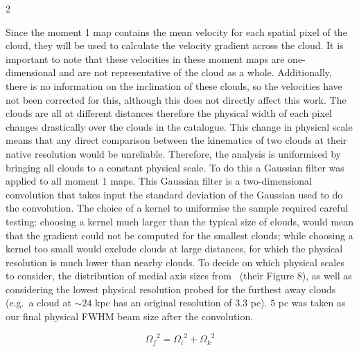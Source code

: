 \documentclass[a4paper,11pt]{article}
\begin{document}
\begin{multicols}{2}
\par\noindent Since the moment 1 map contains the mean velocity for each spatial pixel of the cloud, they will be used to calculate the velocity gradient across the cloud. It is important to note that these velocities in these moment maps are one-dimensional and are not representative of the cloud as a whole. Additionally, there is no information on the inclination of these clouds, so the velocities have not been corrected for this, although this does not directly affect this work. The clouds are all at different distances therefore the physical width of each pixel changes drastically over the clouds in the catalogue. This change in physical scale means that any direct comparison between the kinematics of two clouds at their native resolution would be unreliable. Therefore, the analysis is uniformised by bringing all clouds to a constant physical scale. To do this a Gaussian filter was applied to all moment 1 maps. This Gaussian filter is a two-dimensional convolution that takes input the standard deviation of the Gaussian used to do the convolution. The choice of a kernel to uniformise the sample required careful testing: choosing a kernel much larger than the typical size of clouds, would mean that the gradient could not be computed for the smallest clouds; while choosing a kernel too small would exclude clouds at large distances, for which the physical resolution is much lower than nearby clouds. To decide on which physical scales to consider, the distribution of medial axis sizes from\ \cite{SEDIGISM_ana} (their Figure 8), as well as considering the lowest physical resolution probed for the furthest away clouds (e.g.\ a cloud at $\sim24$ kpc has an original resolution of $3.3$ pc). $5$ pc was taken as our final physical FWHM beam size after the convolution.

\begin{equation}
  {\Omega_{f}}^{2} = {\Omega_{i}}^{2} + {\Omega_{k}}^{2}\label{eq:8}
  \tag{8}
\end{equation}


\end{multicols}
\end{document}
